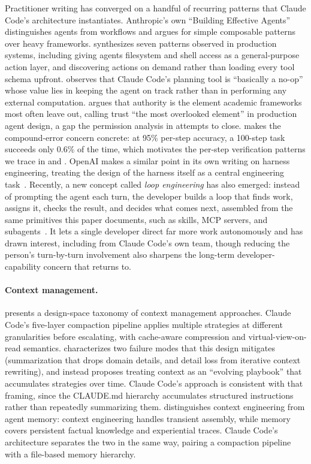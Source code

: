Practitioner writing has converged on a handful of recurring patterns that Claude Code's architecture instantiates. Anthropic's own ``Building Effective Agents'' \citep{anthropic2024effective} distinguishes agents from workflows and argues for simple composable patterns over heavy frameworks. \citet{martin2026patterns} synthesizes seven patterns observed in production systems, including giving agents filesystem and shell access as a general-purpose action layer, and discovering actions on demand rather than loading every tool schema upfront. \citet{chase2025deepagents} observes that Claude Code's planning tool is ``basically a no-op'' whose value lies in keeping the agent on track rather than in performing any external computation. \citet{swyx2025agentengineering} argues that authority is the element academic frameworks most often leave out, calling trust ``the most overlooked element'' in production agent design, a gap the permission analysis in  attempts to close. \citet{huyen2025agents} makes the compound-error concern concrete: at 95\% per-step accuracy, a 100-step task succeeds only 0.6\% of the time, which motivates the per-step verification patterns we trace in  and . OpenAI makes a similar point in its own writing on harness engineering, treating the design of the harness itself as a central engineering task~\citep{openai2026harness}. Recently, a new concept called \emph{loop engineering} has also emerged: instead of prompting the agent each turn, the developer builds a loop that finds work, assigns it, checks the result, and decides what comes next, assembled from the same primitives this paper documents, such as skills, MCP servers, and subagents~\citep{osmani2026loop}. It lets a single developer direct far more work autonomously and has drawn interest, including from Claude Code's own team, though reducing the person's turn-by-turn involvement also sharpens the long-term developer-capability concern that  returns to.

\paragraph{Context management.}
 presents a design-space taxonomy of context management approaches. Claude Code's five-layer compaction pipeline applies multiple strategies at different granularities before escalating, with cache-aware compression and virtual-view-on-read semantics. \citet{zhang2026ace} characterizes two failure modes that this design mitigates (summarization that drops domain details, and detail loss from iterative context rewriting), and instead proposes treating context as an ``evolving playbook'' that accumulates strategies over time. Claude Code's approach is consistent with that framing, since the CLAUDE.md hierarchy accumulates structured instructions rather than repeatedly summarizing them. \citet{hu2025memory} distinguishes context engineering from agent memory: context engineering handles transient assembly, while memory covers persistent factual knowledge and experiential traces. Claude Code's architecture separates the two in the same way, pairing a compaction pipeline with a file-based memory hierarchy.

